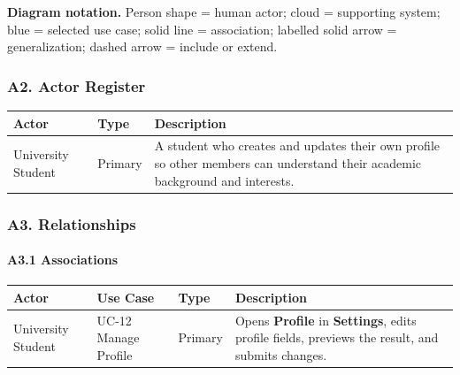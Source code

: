 \documentclass[12pt]{article}
\renewcommand{\baselinestretch}{1.5}
\begin{document}
\textbf{Diagram notation.} Person shape = human actor; cloud = supporting system; blue = selected use case; solid line = association; labelled solid arrow = generalization; dashed arrow = include or extend.
\par\medskip

\hypertarget{sec:a2-actor-register}{}
\subsubsection*{A2. Actor Register}
\par\medskip

\begingroup
\small
\renewcommand{\baselinestretch}{1.0}\selectfont
\renewcommand{\arraystretch}{1.15}
\setlength{\tabcolsep}{6pt}
\begin{longtable}{|>{\raggedright\arraybackslash}p{}|>{\raggedright\arraybackslash}p{}|>{\raggedright\arraybackslash}p{}|}
\hline
\textbf{Actor} & \textbf{Type} & \textbf{Description} \\ \hline
\endhead
University Student & Primary & A student who creates and updates their own profile so other members can understand their academic background and interests. \\ \hline
\end{longtable}
\endgroup
\par\medskip

\hypertarget{sec:a3-relationships}{}
\subsubsection*{A3. Relationships}
\par\medskip

\hypertarget{sec:a3-1-associations}{}
\paragraph*{A3.1 Associations}
\par\medskip

\begingroup
\small
\renewcommand{\baselinestretch}{1.0}\selectfont
\renewcommand{\arraystretch}{1.15}
\setlength{\tabcolsep}{6pt}
\begin{longtable}{|>{\raggedright\arraybackslash}p{}|>{\raggedright\arraybackslash}p{}|>{\raggedright\arraybackslash}p{}|>{\raggedright\arraybackslash}p{}|}
\hline
\textbf{Actor} & \textbf{Use Case} & \textbf{Type} & \textbf{Description} \\ \hline
\endhead
University Student & UC-12 Manage Profile & Primary & Opens \textbf{Profile} in \textbf{Settings}, edits profile fields, previews the result, and submits changes. \\ \hline
\end{longtable}
\endgroup
\par\medskip
\end{document}

